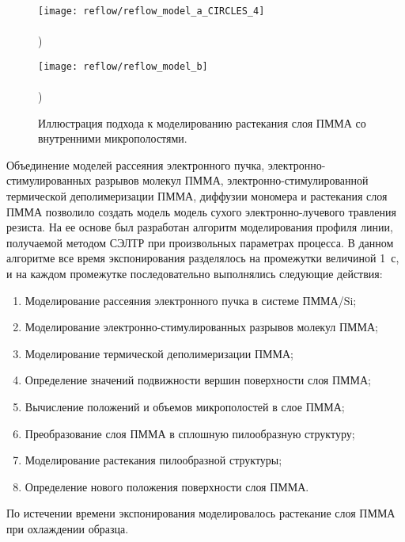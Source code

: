 \begin{figure}[h]
	\begin{minipage}{0.48\textwidth}
		\texttt{[image: reflow/reflow\_model\_a\_CIRCLES\_4]} \\
		\vspace{-28.5ex} \\ ) \\ \vspace{28.5ex}
	\end{minipage}
	\begin{minipage}{0.48\textwidth}
		\texttt{[image: reflow/reflow\_model\_b]} \\
		\vspace{-28.5ex} \\ ) \\ \vspace{28.5ex}
	\end{minipage}
	\vspace{-3.5em}
	\caption{Иллюстрация подхода к моделированию растекания слоя ПММА со внутренними микрополостями.}
	\label{fig:reflow_surface}
\end{figure}

Объединение моделей рассеяния электронного пучка, электронно-стимулированных разрывов молекул ПММА, электронно-стимулированной термической деполимеризации ПММА, диффузии мономера и растекания слоя ПММА позволило создать модель модель сухого электронно-лучевого травления резиста.
На ее основе был разработан алгоритм моделирования профиля линии, получаемой методом СЭЛТР при произвольных параметрах процесса.
В данном алгоритме все время экспонирования разделялось на промежутки величиной 1~с, и на каждом промежутке последовательно выполнялись следующие действия:

\begin{enumerate}
	\item Моделирование рассеяния электронного пучка в системе ПММА/Si;
	\item Моделирование электронно-стимулированных разрывов молекул ПММА;
	\item Моделирование термической деполимеризации ПММА;
	\item Определение значений подвижности вершин поверхности слоя ПММА;
	\item Вычисление положений и объемов микрополостей в слое ПММА;
	\item Преобразование слоя ПММА в сплошную пилообразную структуру;
	\item Моделирование растекания пилообразной структуры;
	\item Определение нового положения поверхности слоя ПММА.
\end{enumerate}
По истечении времени экспонирования моделировалось растекание слоя ПММА при охлаждении образца.

